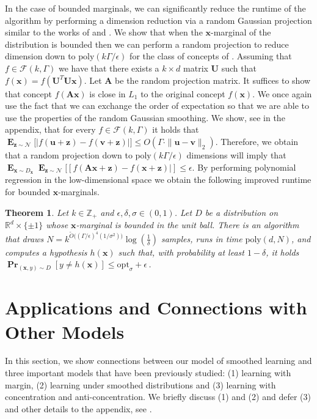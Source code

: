 \documentclass[10pt,a4paper]{article}
\newtheorem{theorem}{Theorem}[section]
\newcommand\twonorm[1]{\|#1\|_2}
\renewcommand\vec[1]{\mathbf{#1}}
\DeclareMathOperator*{\pr}{\mathbf{Pr}}
\DeclareMathOperator*{\E}{\mathbf{E}}
\newcommand{\normal}{\mathcal{N}}
\newcommand{\R}{\mathbb{R}}
\newcommand{\eps}{\epsilon}
\newcommand{\poly}{\mathrm{poly}}
\newcommand{\opt}{\mathrm{opt}}
\newcommand{\D}{D}
\newcommand{\1}{\Ind}
\newcommand{\x}{\vec x}
\newcommand{\vv}{\vec v}
\newcommand{\vu}{\vec u}
\newcommand{\z}{\vec z}
\newcommand{\Gauss}{\mathcal{N}}
\newcommand{\Djoint}{D}
\begin{document}
In the case of bounded marginals, we can significantly reduce the runtime of the algorithm
by performing a dimension reduction via a random Gaussian projection similar to the
works of \cite{ArriagaVempala:99} and \cite{klivans-servedio-margin}.   We show that 
when the $\x$-marginal of the distribution is bounded then we can perform a random projection
to reduce dimension down to $\poly(k \Gamma/\eps)$ for the class of concepts of .  Assuming that $f\in \mathcal F(k, \Gamma)$ we have that there exists a $k\times d$ matrix 
$\vec U$ such that $f(\x) = f(\vec U^T \vec U \x)$.  Let $\vec A$ be the random projection matrix.
It suffices to show that concept $f(\vec A \vec x)$ is close in $L_1$ to the original concept $f(\x)$. 
We once again use the fact that we can exchange the order of expectation so that we are able to use
the properties of the random Gaussian smoothing.  We show, see  in the appendix, that for every $f \in \mathcal{F}(k, \Gamma)$ it holds that 
    $\E_{\z\sim \Gauss}\bigl[|f(\vu+\z)-f(\vv+\z)|\bigr]\leq O(\Gamma\cdot\twonorm{\vu-\vv})$.
    Therefore, we obtain that a random projection down to $\poly(k\Gamma/\epsilon)$ dimensions will imply
    that $\E_{\x \sim \D_\x}\E_{\vec z \sim \normal}[[f(\vec A \vec x+ \vec z) - f(\vec \x + \vec \z)|] \leq \eps$. By performing polynomial regression in the low-dimensional space we obtain the following improved
    runtime for bounded $\x$-marginals.
\begin{theorem}
\label{thm:random_proj_bounded_main}
    Let $k \in \mathbb Z_+$ and $\epsilon, \delta,\sigma \in (0,1)$. Let $D$ be a distribution on $\R^d\times \{\pm 1\}$ whose $\x$-marginal is bounded in the unit ball.  There is an algorithm that draws $N = k^{\tilde{O}\big((\Gamma/\epsilon)^4(1/\sigma^2)\big)}\log (\frac{1}{\delta})$ samples, runs in time $\poly(d,N)$, and computes a hypothesis $h(\x)$ such that, with probability at least $1-\delta$, it holds
    $ \pr_{(\x, y) \sim \Djoint}[y\neq h(\x)] \le \opt_\sigma + \eps\,$.
\end{theorem}




\section{Applications and Connections with Other Models}
In this section, we show connections between our model of smoothed learning and three important models that have been previously studied: (1) learning with margin, (2) learning under smoothed distributions and (3) learning with concentration and anti-concentration.  We briefly discuss (1) and (2) and defer (3) and other details to the appendix, see . 
\end{document}
